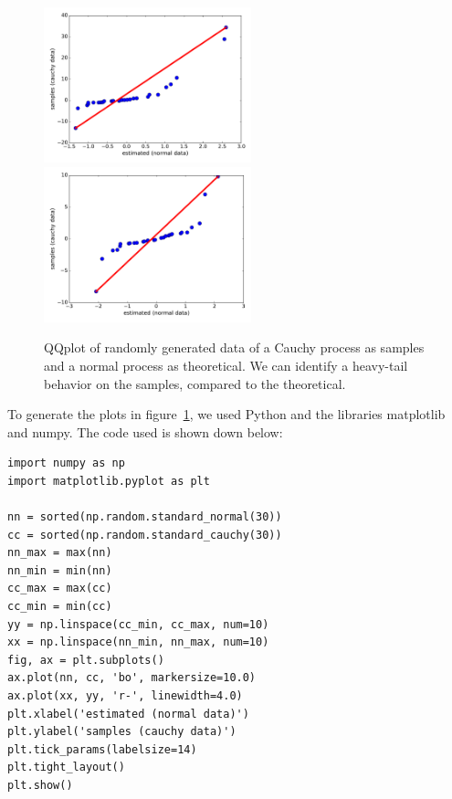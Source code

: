 \begin{figure}[t!]
    \centering
        \includegraphics[width=60mm]{figures/apA/qq-c1}
    \hspace{0mm}
        \includegraphics[width=60mm]{figures/apA/qq-c2}
    \caption{QQplot of randomly generated data of a Cauchy process as samples and a normal process as theoretical. We can identify a heavy-tail behavior on the samples, compared to the theoretical.}
    \label{fig:qq-cauchy}
\end{figure}



To generate the plots in figure~\ref{fig:qq-cauchy}, we used Python and the libraries matplotlib and numpy. The code used is shown down below: 


\begin{verbatim}
import numpy as np
import matplotlib.pyplot as plt

nn = sorted(np.random.standard_normal(30))
cc = sorted(np.random.standard_cauchy(30))
nn_max = max(nn)
nn_min = min(nn)
cc_max = max(cc)
cc_min = min(cc)
yy = np.linspace(cc_min, cc_max, num=10)
xx = np.linspace(nn_min, nn_max, num=10)
fig, ax = plt.subplots()
ax.plot(nn, cc, 'bo', markersize=10.0)
ax.plot(xx, yy, 'r-', linewidth=4.0)
plt.xlabel('estimated (normal data)')
plt.ylabel('samples (cauchy data)')
plt.tick_params(labelsize=14)
plt.tight_layout()
plt.show()
\end{verbatim}



